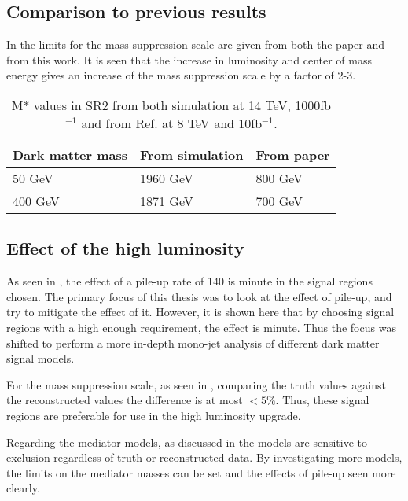 \subsection{Comparison to previous results}
In  the limits for the mass suppression scale are given from both the paper and from this work. It is seen that the increase in luminosity and center of mass energy gives an increase of the mass suppression scale by a factor of 2-3.

\begin{table}[ht]
\begin{center}
\begin{tabular}{|l|l|l|}
\hline
Dark matter mass & From simulation & From paper \\ \hline
50 GeV & 1960 GeV &800 GeV \\
400 GeV & 1871 GeV & 700 GeV \\ \hline
\end{tabular}
\caption{M* values in SR2 from both simulation at 14 TeV, 1000fb$^{-1}$ and from Ref. \citep{ATLAS-CONF-2012-147} at 8 TeV and 10fb$^{-1}$. }
\label{Comp pval}
\end{center}
\end{table}

\subsection{Effect of the high luminosity}\label{subsec:hleff}
As seen in , the effect of a pile-up rate of 140 is minute in the signal regions chosen. The primary focus of this thesis was to look at the effect of pile-up, and try to mitigate the effect of it. However, it is shown here that by choosing signal regions with a high enough requirement, the effect is minute. Thus the focus was shifted to perform a more in-depth mono-jet analysis of different dark matter signal models. 

For the mass suppression scale, as seen in , comparing the truth values against the reconstructed values the difference is at most $<5 \% $. Thus, these signal regions are preferable for use in the high luminosity upgrade. 

Regarding the mediator models, as discussed in  the models are sensitive to exclusion regardless of truth or reconstructed data. By investigating more models, the limits on the mediator masses can be set and the effects of pile-up seen more clearly.


